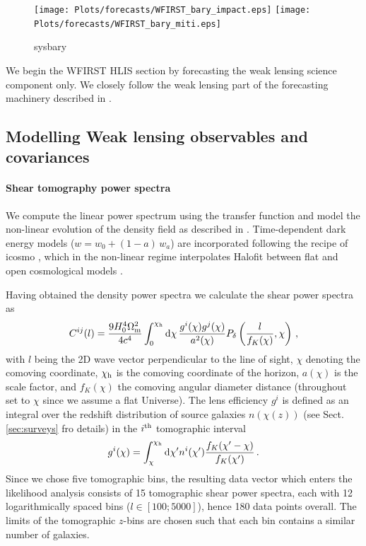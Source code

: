 \begin{figure}
\texttt{[image: Plots/forecasts/WFIRST\_bary\_impact.eps]}
\texttt{[image: Plots/forecasts/WFIRST\_bary\_miti.eps]}
\caption{sysbary}
         \label{fi:bary}
\end{figure}

We begin the WFIRST HLIS section by forecasting the weak lensing science component only. We closely follow the weak lensing part of the forecasting machinery described in \cite{Krause16}. 

\subsection{Modelling Weak lensing observables and covariances}
\label{sec:lensingbasics}

\paragraph*{Shear tomography power spectra}

We compute the linear power spectrum using the \cite{eh99} transfer function and model the non-linear evolution of the density field as described in \cite{tsn12}.
Time-dependent dark energy models ($w=w_0+(1-a)\,w_a$) are incorporated following the recipe of {\sc icosmo} \citep{rak11}, which in the non-linear regime interpolates Halofit between flat and open cosmological models \citep[also see][for more details]{shj10}.

Having obtained the density power spectra we calculate the shear power spectra as
\begin{equation}
\label{eq:pdeltatopkappa}
C ^{ij} (l) = \frac{9H_0^4 \om^2}{4c^4} \int_0^{\chi_\mr h} 
\mr d \chi \, \frac{g^{i}(\chi) g^{j}(\chi)}{a^2(\chi)} \pd \left(\frac{l}{f_K(\chi)},\chi \right) \,,
\end{equation}
with $l$ being the 2D wave vector perpendicular to the line of sight, $\chi$ denoting the comoving coordinate, $\chi_\mathrm h$ is the comoving coordinate of the horizon, $a(\chi)$ is the scale factor, and $f_K(\chi)$ the comoving angular diameter distance (throughout set to $\chi$ since we assume a flat Universe). The lens efficiency $g^{i}$ is defined as an integral over the redshift distribution of source galaxies $n(\chi(z))$ (see Sect. \ref{sec:surveys} fro details) in the $i^\mathrm{th}$ tomographic interval
\begin{equation}
\label{eq:redshift_distri}
g^{i}(\chi) = \int_\chi^{\chi_{\mr h}} \mr d \chi' n^{i} (\chi') \frac{f_K (\chi'-\chi)}{f_K (\chi')} \,.
\end{equation}
Since we chose five tomographic bins, the resulting data vector which enters the likelihood analysis consists of 15 tomographic shear power spectra, each with 12 logarithmically spaced bins ($l \in [100;5000]$), hence 180 data points overall. The limits of the tomographic $z$-bins are chosen such that each bin contains a similar number of galaxies.


